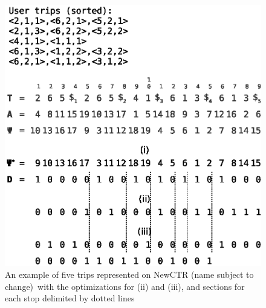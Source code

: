 \documentclass[runningheads]{llncs}
\newcommand{\ctr}{NewCTR (name subject to change)\ }
\begin{document}
\begin{figure}[hbt!]
\includegraphics[width=\textwidth]{example_trips.eps}
\caption{An example of five trips represented on \ctr with the optimizations for (ii) and (iii), and sections for each stop delimited by dotted lines}
\label{fig:example_ctr}
\end{figure}
\end{document}
